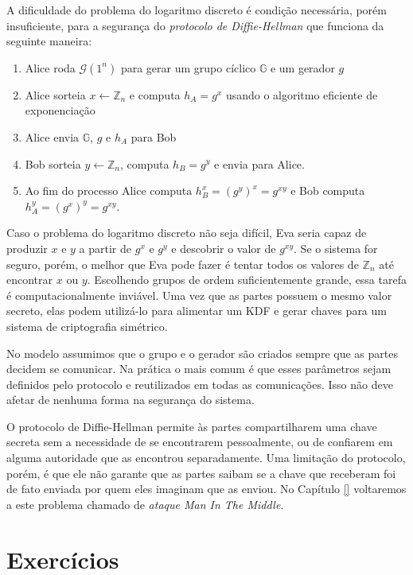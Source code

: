 A dificuldade do problema do logaritmo discreto é condição necessária, porém insuficiente, para a segurança do {\em protocolo de Diffie-Hellman} que funciona da seguinte maneira:
\begin{enumerate}
\item Alice roda $\mathcal{G}(1^n)$ para gerar um grupo cíclico $\mathbb{G}$ e um gerador $g$
\item Alice sorteia $x \leftarrow \mathbb{Z}_n$ e computa $h_A = g^x$ usando o algoritmo eficiente de exponenciação
\item Alice envia $\mathbb{G}$, $g$ e $h_A$ para Bob
\item Bob sorteia $y \leftarrow \mathbb{Z}_n$, computa $h_B = g^y$ e envia para Alice.
\item Ao fim do processo Alice computa $h_B^x = (g^y)^x = g^{xy}$ e Bob computa $h_A^y = (g^x)^y = g^{xy}$.
\end{enumerate}

Caso o problema do logaritmo discreto não seja difícil, Eva seria capaz de produzir $x$ e $y$ a partir de $g^x$ e $g^y$ e descobrir o valor de $g^{xy}$.
Se o sistema for seguro, porém, o melhor que Eva pode fazer é tentar todos os valores de $\mathbb{Z}_n$ até encontrar $x$ ou $y$.
Escolhendo grupos de ordem suficientemente grande, essa tarefa é computacionalmente inviável.
Uma vez que as partes possuem o mesmo valor secreto, elas podem utilizá-lo para alimentar um KDF e gerar chaves para um sistema de criptografia simétrico.

No modelo assumimos que o grupo e o gerador são criados sempre que as partes decidem se comunicar.
Na prática o mais comum é que esses parâmetros sejam definidos pelo protocolo e reutilizados em todas as comunicações.
Isso não deve afetar de nenhuma forma na segurança do sistema.

O protocolo de Diffie-Hellman permite às partes compartilharem uma chave secreta sem a necessidade de se encontrarem pessoalmente, ou de confiarem em alguma autoridade que as encontrou separadamente.
Uma limitação do protocolo, porém, é que ele não garante que as partes saibam se a chave que receberam foi de fato enviada por quem eles imaginam que as enviou.
No Capítulo \ref{} voltaremos a este problema chamado de {\em ataque Man In The Middle}.



\section{Exercícios}
\label{sec:exercicios}



